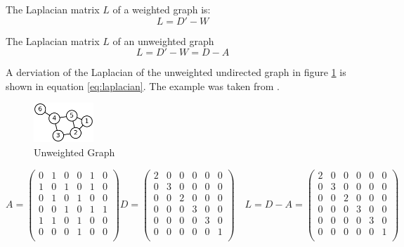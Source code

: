\documentclass[a4paper, 11pt]{article}
\begin{document}
The Laplacian matrix $L$ of a weighted graph is:
\begin{equation}
 L = D' - W  
\end{equation}

The Laplacian matrix $L$ of an unweighted graph 
\begin{equation}
L = D' - W = D - A
\end{equation}


A derviation of the Laplacian of the unweighted undirected graph in figure \ref{fig:graph} is shown in equation \ref{eq:laplacian}. The example was taken from \cite{wikipedia2017}.
\begin{figure}[h]
  \centering
    \includegraphics[width=0.2\textwidth]{figures/graph.png}
	\caption{Unweighted Graph}    
    \label{fig:graph}
\end{figure}

\begin{equation} \label{eq:laplacian}
A = 
 \begin{pmatrix}
  0 & 1 & 0 & 0 & 1 & 0 \\
  1 & 0 & 1 & 0 & 1 & 0 \\
  0 & 1 & 0 & 1 & 0 & 0 \\
  0 & 0 & 1 & 0 & 1 & 1 \\
  1 & 1 & 0 & 1 & 0 & 0 \\  
  0 & 0 & 0 & 1 & 0 & 0 \\
  \end{pmatrix}
D = 
 \begin{pmatrix}
  2 & 0 & 0 & 0 & 0 & 0 \\
  0 & 3 & 0 & 0 & 0 & 0 \\
  0 & 0 & 2 & 0 & 0 & 0 \\
  0 & 0 & 0 & 3 & 0 & 0 \\
  0 & 0 & 0 & 0 & 3 & 0 \\  
  0 & 0 & 0 & 0 & 0 & 1 \\
 \end{pmatrix} 
 \quad  
L = D - A = 
 \begin{pmatrix}
  2 & 0 & 0 & 0 & 0 & 0 \\
  0 & 3 & 0 & 0 & 0 & 0 \\
  0 & 0 & 2 & 0 & 0 & 0 \\
  0 & 0 & 0 & 3 & 0 & 0 \\
  0 & 0 & 0 & 0 & 3 & 0 \\  
  0 & 0 & 0 & 0 & 0 & 1 \\
  \end{pmatrix}
\end{equation}
\end{document}

